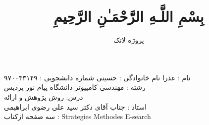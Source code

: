 \documentclass[a4 paper,12pt]{article}\usepackage{xepersian}
\title{بِسْمِ اللَّـهِ الرَّحْمَـٰنِ الرَّحِيمِ }
\author{پروژه لاتک}
\begin{document}
\maketitle



\noindent
نام   : عذرا نام خانوادگی : حسینی          شماره دانشجویی : ۹۷۰۰۴۳۱۴۹\\  رشته : مهندسی کامپیوتر دانشگاه پیام نور پردیس  \\ درس:  روش پژوهش و ارائه  \\ استاد : جناب آقای دکتر سید علی رضوی ابراهیمی\\

\noindent
                                                                                                                                                                                                                                                                                                                                                                                                          سه صفحه ازکتاب : Strategies Methodes E-search
\vspace{0.1cm}
\vspace{0.1cm}
\end{document}
